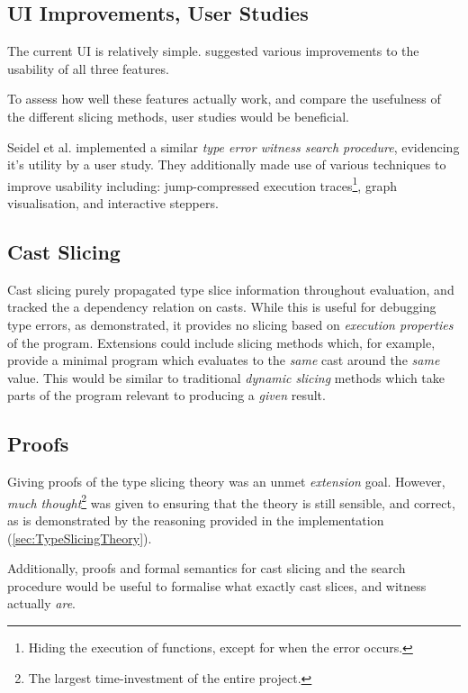 \subsection{UI Improvements, User Studies}
The current UI is relatively simple.  suggested various improvements to the usability of all three features. 

To assess how well these features actually work, and compare the usefulness of the different slicing methods, user studies would be beneficial.

Seidel et al. \cite{SearchProc} implemented a similar \textit{type error witness search procedure}, evidencing it's utility by a user study. They additionally made use of various techniques to improve usability including: jump-compressed execution traces\footnote{Hiding the execution of functions, except for when the error occurs.}, graph visualisation, and interactive steppers.

\subsection{Cast Slicing}
Cast slicing purely propagated type slice information throughout evaluation, and tracked the a dependency relation on casts. While this is useful for debugging type errors, as demonstrated, it provides no slicing based on \textit{execution properties} of the program. Extensions could include slicing methods which, for example, provide a minimal program which evaluates to the \textit{same} cast around the \textit{same} value. This would be similar to traditional \textit{dynamic slicing} methods \cite{DynProgSlice, FunctionalProgExplain} which take parts of the program relevant to producing a \textit{given} result.


\subsection{Proofs}

Giving proofs of the type slicing theory was an unmet \textit{extension} goal. However, \textit{much thought}\footnote{The largest time-investment of the entire project.} was given to ensuring that the theory is still sensible, and correct, as is demonstrated by the reasoning provided in the implementation (\cref{sec:TypeSlicingTheory}).

Additionally, proofs and formal semantics for cast slicing and the search procedure would be useful to formalise what exactly cast slices, and witness actually \textit{are}.

